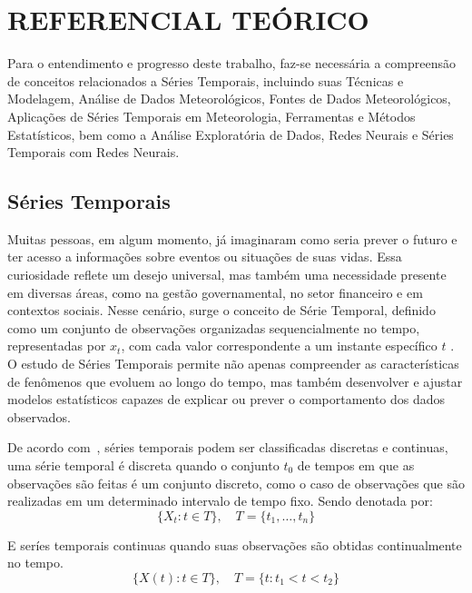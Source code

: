 \chapter{REFERENCIAL TEÓRICO}
Para o entendimento e progresso deste trabalho, faz-se necessária a compreensão de conceitos relacionados a Séries Temporais, incluindo suas Técnicas e Modelagem, Análise de Dados Meteorológicos, Fontes de Dados Meteorológicos, Aplicações de Séries Temporais em Meteorologia, Ferramentas e Métodos Estatísticos, bem como a Análise Exploratória de Dados, Redes Neurais e Séries Temporais com Redes Neurais. 

\section{Séries Temporais}
    Muitas pessoas, em algum momento, já imaginaram como seria prever o futuro e ter acesso a informações sobre eventos 
    ou situações de suas vidas. Essa curiosidade reflete um desejo universal, mas também uma necessidade presente em 
    diversas áreas, como na gestão governamental, no setor financeiro e em contextos sociais. Nesse cenário, surge o 
    conceito de Série Temporal, definido como um conjunto de observações organizadas sequencialmente no tempo, 
    representadas por \( x_t \), com cada valor correspondente a um instante específico \(t\) \cite{box2015}. O estudo de 
    Séries Temporais permite não apenas compreender as características de fenômenos que evoluem ao longo do tempo, mas 
    também desenvolver e ajustar modelos estatísticos capazes de explicar ou prever o comportamento dos dados 
    observados.
    
    De acordo com~\cite{brockwell2002}, séries temporais podem ser classificadas 
    discretas e continuas, uma série temporal é discreta quando o conjunto \( t_0 \) de tempos em que as observações 
    são feitas é um conjunto discreto, como o caso de observações que são realizadas em um determinado intervalo de 
    tempo fixo. Sendo denotada por:
    \begin{equation}
        \{X_t : t \in T\}, \quad T = \{t_1, \dots, t_n\}
    \end{equation}
    
    
    
    E seríes temporais continuas quando suas observações são obtidas continualmente 
    no tempo. 
    \begin{equation}
        \{X(t) : t \in T\}, \quad T = \{t : t_1 < t < t_2\}
    \end{equation}
        

